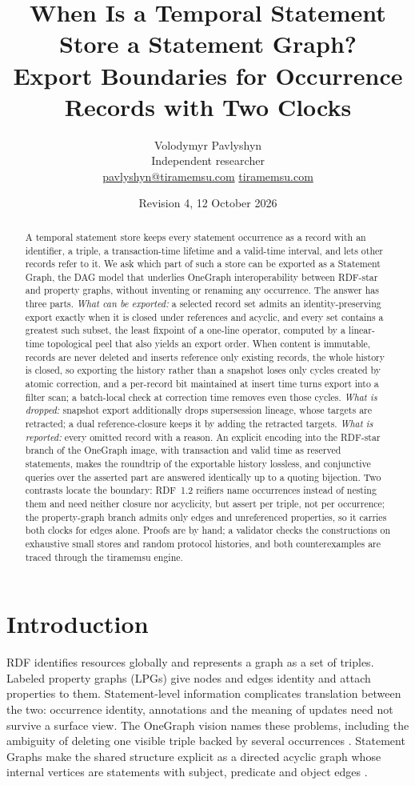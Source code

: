 \documentclass[11pt]{article}
\title{When Is a Temporal Statement Store a Statement Graph?\\[2pt]
\large Export Boundaries for Occurrence Records with Two Clocks}
\author{Volodymyr Pavlyshyn\\[2pt]\small Independent researcher\\
\small\href{mailto:pavlyshyn@tiramemsu.com}{pavlyshyn@tiramemsu.com}\quad
\small\href{https://tiramemsu.com}{tiramemsu.com}}
\date{Revision 4, 12 October 2026}
\theoremstyle{plain}
\theoremstyle{definition}
\theoremstyle{remark}
\begin{document}
\maketitle

\begin{abstract}
A temporal statement store keeps every statement occurrence as a record with an
identifier, a triple, a transaction-time lifetime and a valid-time interval, and
lets other records refer to it. We ask which part of such a store can be exported
as a Statement Graph, the DAG model that underlies OneGraph interoperability
between RDF-star and property graphs, without inventing or renaming any occurrence.
The answer has three parts. \emph{What can be exported:} a selected record set
admits an identity-preserving export exactly when it is closed under references and
acyclic, and every set contains a greatest such subset, the least fixpoint of a
one-line operator, computed by a linear-time topological peel that also yields an
export order. When content is immutable, records are never deleted and inserts
reference only existing records, the whole history is closed, so exporting the history rather than a snapshot loses only cycles created by
atomic correction, and a per-record bit maintained at insert time turns export into
a filter scan; a batch-local check at correction time removes even those cycles.
\emph{What is dropped:} snapshot export additionally drops
supersession lineage, whose targets are retracted; a dual reference-closure keeps it
by adding the retracted targets. \emph{What is reported:} every omitted record with
a reason. An explicit encoding into the RDF-star branch of the OneGraph image, with
transaction and valid time as reserved statements, makes the roundtrip of the
exportable history lossless, and conjunctive queries over the asserted part are answered
identically up to a quoting bijection. Two contrasts locate the boundary: RDF~1.2
reifiers name occurrences instead of nesting them and need neither closure nor
acyclicity, but assert per triple, not per occurrence; the property-graph branch
admits only edges and unreferenced properties, so it carries both clocks for edges
alone. Proofs are by hand; a validator checks the constructions on exhaustive small
stores and random protocol histories, and both counterexamples are traced through
the tiramemsu engine.
\end{abstract}

\section{Introduction}
RDF identifies resources globally and represents a graph as a set of triples.
Labeled property graphs (LPGs) give nodes and edges identity and attach properties
to them. Statement-level information complicates translation between the two:
occurrence identity, annotations and the meaning of updates need not survive a
surface view. The OneGraph vision names these problems, including the ambiguity of
deleting one visible triple backed by several occurrences \cite{lassila2023onegraph}.
Statement Graphs make the shared structure explicit as a directed acyclic graph
whose internal vertices are statements with subject, predicate and object edges
\cite{gelling2023bridging,gelling2024statement}.
\end{document}

